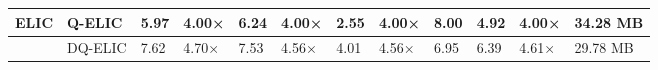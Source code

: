\begin{tabular}{llllllllllll}
\toprule
ELIC & Q-ELIC & 5.97 & 4.00× & 6.24 & 4.00× & 2.55 & 4.00× & 8.00 & 4.92 & 4.00× & 34.28 MB \\
\midrule
 & DQ-ELIC & 7.62 & 4.70× & 7.53 & 4.56× & 4.01 & 4.56× & 6.95 & 6.39 & 4.61× & 29.78 MB \\
\bottomrule
\end{tabular}
